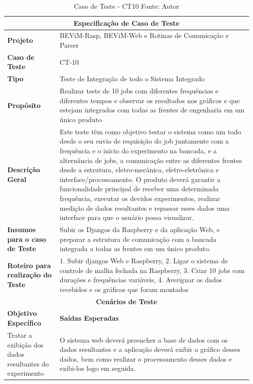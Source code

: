\begin{table}[H]
    \begin{center}
        \begin{tabular}{|p{5cm}|p{12cm}|}
            \hline
            \multicolumn{2}{|c|}{\textbf{Especificação de Caso de Teste}} \\ \hline
                \textbf{Projeto}                                        & BEViM-Rasp, BEViM-Web e Rotinas de Comunicação e Parser\\ \hline
                \textbf{Caso de Teste}                             & CT-10 \\ \hline
                \textbf{Tipo}                                             & Teste de Integração de todo o Sistema Integrado \\ \hline
                \textbf{Propósito}                                     & Realizar teste de 10 jobs com diferentes frequências e diferentes tempos e observar os resultados nos gráficos e que estejam integrados com todas as frentes de engenharia em um único produto \\ \hline
                \textbf{Descrição Geral}                           & Este teste têm como objetivo testar o sistema como um todo desde o seu envio de requisição do job juntamente com a frequência e o inicio do experimento na bancada, e a alternância de jobs, a comunicação entre as diferentes frentes desde a estrutura, eletro-mecânica, eletro-eletrônica e interface/processamento. O produto deverá garantir a funcionalidade principal de receber uma determinada frequência, executar os devidos experimentos, realizar medição de dados resultantes e repassar esses dados uma interface para que o usuário possa visualizar. \\ \hline
                \textbf{Insumos para o caso de Teste}    & Subir os Djangos da Raspberry e da aplicação Web, e preparar a estrutura de comunicação com a bancada integrada a todas as frentes em um único produto. \\ \hline
                \textbf{Roteiro para realização do Teste}&  1. Subir djangos Web e Raspberry, 2. Ligar o sistema de controle de malha fechada na Raspberry, 3. Criar 10 jobs com durações e frequências variáveis,  4. Averiguar os dados recebidos e os gráficos que foram montados  \\ \hline
            \multicolumn{2}{|c|}{\textbf{Cenários de Teste}} \\ \hline
                \textbf{Objetivo Específico}                      & \textbf{Saídas Esperadas} \\ \hline
                Tratar a exibição dos dados resultantes do experimento & O sistema web deverá preencher a base de dados com os dados resultantes e a aplicação deverá exibir o gráfico desses dados, bem como realizar o processamento desses dados e exibi-los logo em seguida. \\ \hline
        \end{tabular}
    \end{center}
    \caption[Caso de Teste - CT10]{Caso de Teste - CT10
    \protect Fonte: Autor}
    \label{CT-10}
\end{table}

